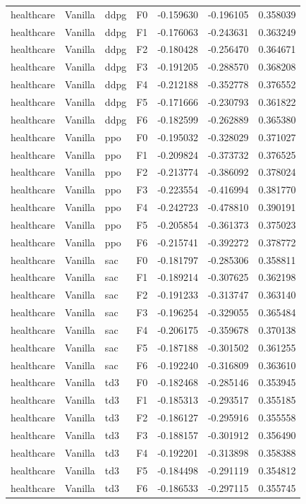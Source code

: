 \begin{tabular}{llllrrr}
healthcare & Vanilla &      ddpg &  F0 & -0.159630 & -0.196105 &  0.358039 \\
healthcare & Vanilla &      ddpg &  F1 & -0.176063 & -0.243631 &  0.363249 \\
healthcare & Vanilla &      ddpg &  F2 & -0.180428 & -0.256470 &  0.364671 \\
healthcare & Vanilla &      ddpg &  F3 & -0.191205 & -0.288570 &  0.368208 \\
healthcare & Vanilla &      ddpg &  F4 & -0.212188 & -0.352778 &  0.376552 \\
healthcare & Vanilla &      ddpg &  F5 & -0.171666 & -0.230793 &  0.361822 \\
healthcare & Vanilla &      ddpg &  F6 & -0.182599 & -0.262889 &  0.365380 \\
healthcare & Vanilla &       ppo &  F0 & -0.195032 & -0.328029 &  0.371027 \\
healthcare & Vanilla &       ppo &  F1 & -0.209824 & -0.373732 &  0.376525 \\
healthcare & Vanilla &       ppo &  F2 & -0.213774 & -0.386092 &  0.378024 \\
healthcare & Vanilla &       ppo &  F3 & -0.223554 & -0.416994 &  0.381770 \\
healthcare & Vanilla &       ppo &  F4 & -0.242723 & -0.478810 &  0.390191 \\
healthcare & Vanilla &       ppo &  F5 & -0.205854 & -0.361373 &  0.375023 \\
healthcare & Vanilla &       ppo &  F6 & -0.215741 & -0.392272 &  0.378772 \\
healthcare & Vanilla &       sac &  F0 & -0.181797 & -0.285306 &  0.358811 \\
healthcare & Vanilla &       sac &  F1 & -0.189214 & -0.307625 &  0.362198 \\
healthcare & Vanilla &       sac &  F2 & -0.191233 & -0.313747 &  0.363140 \\
healthcare & Vanilla &       sac &  F3 & -0.196254 & -0.329055 &  0.365484 \\
healthcare & Vanilla &       sac &  F4 & -0.206175 & -0.359678 &  0.370138 \\
healthcare & Vanilla &       sac &  F5 & -0.187188 & -0.301502 &  0.361255 \\
healthcare & Vanilla &       sac &  F6 & -0.192240 & -0.316809 &  0.363610 \\
healthcare & Vanilla &       td3 &  F0 & -0.182468 & -0.285146 &  0.353945 \\
healthcare & Vanilla &       td3 &  F1 & -0.185313 & -0.293517 &  0.355185 \\
healthcare & Vanilla &       td3 &  F2 & -0.186127 & -0.295916 &  0.355558 \\
healthcare & Vanilla &       td3 &  F3 & -0.188157 & -0.301912 &  0.356490 \\
healthcare & Vanilla &       td3 &  F4 & -0.192201 & -0.313898 &  0.358388 \\
healthcare & Vanilla &       td3 &  F5 & -0.184498 & -0.291119 &  0.354812 \\
healthcare & Vanilla &       td3 &  F6 & -0.186533 & -0.297115 &  0.355745 \\
\bottomrule
\end{tabular}
